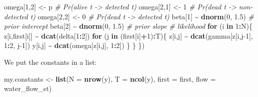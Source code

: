 \documentclass[
  12pt,
]{krantz}
\newenvironment{Shaded}{\begin{snugshade}}{\end{snugshade}}
\newcommand{\AttributeTok}[1]{\textcolor[rgb]{0.13,0.29,0.53}{#1}}
\newcommand{\CommentTok}[1]{\textcolor[rgb]{0.56,0.35,0.01}{\textit{#1}}}
\newcommand{\ControlFlowTok}[1]{\textcolor[rgb]{0.13,0.29,0.53}{\textbf{#1}}}
\newcommand{\DecValTok}[1]{\textcolor[rgb]{0.00,0.00,0.81}{#1}}
\newcommand{\FloatTok}[1]{\textcolor[rgb]{0.00,0.00,0.81}{#1}}
\newcommand{\FunctionTok}[1]{\textcolor[rgb]{0.13,0.29,0.53}{\textbf{#1}}}
\newcommand{\NormalTok}[1]{#1}
\newcommand{\OtherTok}[1]{\textcolor[rgb]{0.56,0.35,0.01}{#1}}
\newcommand{\SpecialCharTok}[1]{\textcolor[rgb]{0.81,0.36,0.00}{\textbf{#1}}}
\begin{document}
\begin{Shaded}
\begin{Highlighting}[]
\NormalTok{  omega[}\DecValTok{1}\NormalTok{,}\DecValTok{2}\NormalTok{] }\OtherTok{\textless{}{-}}\NormalTok{ p               }\CommentTok{\# Pr(alive t {-}\textgreater{} detected t)}
\NormalTok{  omega[}\DecValTok{2}\NormalTok{,}\DecValTok{1}\NormalTok{] }\OtherTok{\textless{}{-}} \DecValTok{1}               \CommentTok{\# Pr(dead t {-}\textgreater{} non{-}detected t)}
\NormalTok{  omega[}\DecValTok{2}\NormalTok{,}\DecValTok{2}\NormalTok{] }\OtherTok{\textless{}{-}} \DecValTok{0}               \CommentTok{\# Pr(dead t {-}\textgreater{} detected t)}
\NormalTok{  beta[}\DecValTok{1}\NormalTok{] }\SpecialCharTok{\textasciitilde{}} \FunctionTok{dnorm}\NormalTok{(}\DecValTok{0}\NormalTok{, }\FloatTok{1.5}\NormalTok{)       }\CommentTok{\# prior intercept}
\NormalTok{  beta[}\DecValTok{2}\NormalTok{] }\SpecialCharTok{\textasciitilde{}} \FunctionTok{dnorm}\NormalTok{(}\DecValTok{0}\NormalTok{, }\FloatTok{1.5}\NormalTok{)       }\CommentTok{\# prior slope}
  \CommentTok{\# likelihood}
  \ControlFlowTok{for}\NormalTok{ (i }\ControlFlowTok{in} \DecValTok{1}\SpecialCharTok{:}\NormalTok{N)\{}
\NormalTok{    z[i,first[i]] }\SpecialCharTok{\textasciitilde{}} \FunctionTok{dcat}\NormalTok{(delta[}\DecValTok{1}\SpecialCharTok{:}\DecValTok{2}\NormalTok{])}
    \ControlFlowTok{for}\NormalTok{ (j }\ControlFlowTok{in}\NormalTok{ (first[i]}\SpecialCharTok{+}\DecValTok{1}\NormalTok{)}\SpecialCharTok{:}\NormalTok{T)\{}
\NormalTok{      z[i,j] }\SpecialCharTok{\textasciitilde{}} \FunctionTok{dcat}\NormalTok{(gamma[z[i,j}\DecValTok{{-}1}\NormalTok{], }\DecValTok{1}\SpecialCharTok{:}\DecValTok{2}\NormalTok{, j}\DecValTok{{-}1}\NormalTok{])}
\NormalTok{      y[i,j] }\SpecialCharTok{\textasciitilde{}} \FunctionTok{dcat}\NormalTok{(omega[z[i,j], }\DecValTok{1}\SpecialCharTok{:}\DecValTok{2}\NormalTok{])}
\NormalTok{    \}}
\NormalTok{  \}}
\NormalTok{\})}
\end{Highlighting}
\end{Shaded}

We put the constants in a list:

\begin{Shaded}
\begin{Highlighting}[]
\NormalTok{my.constants }\OtherTok{\textless{}{-}} \FunctionTok{list}\NormalTok{(}\AttributeTok{N =} \FunctionTok{nrow}\NormalTok{(y),}
                     \AttributeTok{T =} \FunctionTok{ncol}\NormalTok{(y),}
                     \AttributeTok{first =}\NormalTok{ first,}
                     \AttributeTok{flow =}\NormalTok{ water\_flow\_st)}
\end{Highlighting}
\end{Shaded}
\end{document}
